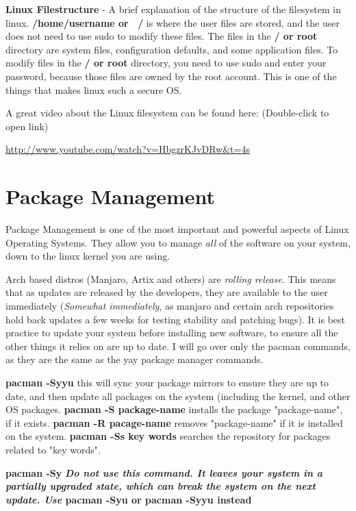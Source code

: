 \documentclass[12pt, letterpaper, twoside]{article}
\begin{document}
\textbf{Linux Filestructure} - A brief explanation of the structure of the filesystem in linux. \textbf{/home/username or ~/} is where the user files are stored, and the user does not need to use sudo to modify these files. The files in the \textbf{/ or root} directory are system files, configuration defaults, and some application files. To modify files in the \textbf{/ or root} directory, you need to use sudo and enter your password, because those files are owned by the root account. This is one of the things that makes linux such a secure OS.

A great video about the Linux filesystem can be found here: 
(Double-click to open link)

\url{http://www.youtube.com/watch?v=HbgzrKJvDRw&t=4s}

\section{Package Management}

Package Management is one of the most important and powerful aspects of Linux Operating Systems. They allow you to manage \textit{all} of the software on your system, down to the linux kernel you are using. 

Arch based distros (Manjaro, Artix and others) are \textit{rolling release}. This means that as updates are released by the developers, they are available to the user immediately (\textit{Somewhat immediately}, as manjaro and certain arch repositories hold back updates a few weeks for testing stability and patching bugs). It is best practice to update your system before installing new software, to ensure all the other things it relies on are up to date. I will go over only the pacman commands, as they are the same as the yay package manager commands.

\textbf{pacman -Syyu} this will sync your package mirrors to ensure they are up to date, and then update all packages on the system (including the kernel, and other OS packages. \textbf{pacman -S package-name} installs the package "package-name", if it exists. \textbf{pacman -R pacage-name} removes "package-name" if it is installed on the system. \textbf{pacman -Ss key words} searches the repository for packages related to "key words".

\textbf{pacman -Sy} \textbf{\textit{Do not use this command. It leaves your system in a partially upgraded state, which can break the system on the next update. Use }pacman -Syu or pacman -Syyu instead}
\end{document}
